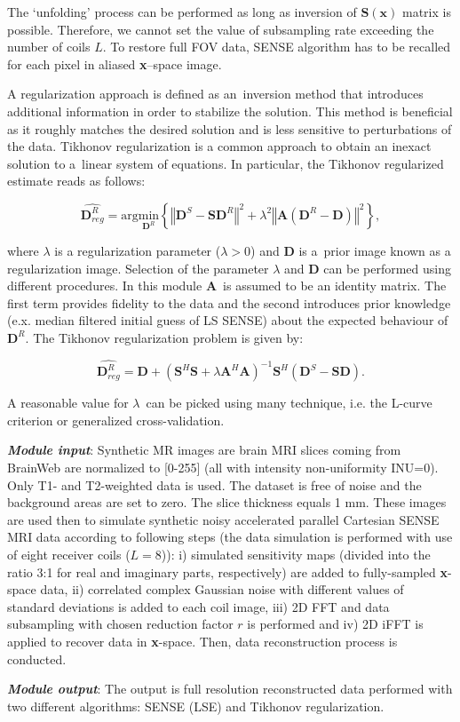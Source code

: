 The `unfolding' process can be performed as long as inversion of $\textbf{S}(\textbf{x})$
matrix is possible. Therefore, we cannot set the value of subsampling
rate exceeding the number of coils $L$. To restore full FOV data,
SENSE algorithm has to be recalled for each pixel in aliased \textbf{x}–space
image.

A regularization approach is defined as an~inversion method that
introduces additional information in order to stabilize the solution.
This method is beneficial as it roughly matches the desired solution
and is less sensitive to perturbations of the data. Tikhonov regularization
is a common approach to obtain an inexact solution to a~linear system
of equations. In particular, the Tikhonov regularized estimate reads
as follows:

\begin{equation}
\widehat{\textbf{D}_{reg}^{R}}=\text{arg}\underset{\textbf{D}^{R}}{\text{min}}\left\{ \left\Vert \textbf{D}^{S}-\textbf{S}\textbf{D}^{R}\right\Vert ^{2}+\lambda^{2}\left\Vert \textbf{A}(\textbf{D}^{R}-\textbf{D})\right\Vert ^{2}\right\} ,\label{Eq:wzor6}
\end{equation}

where $\lambda$ is a regularization parameter ($\lambda>0$) and
$\textbf{D}$ is a~prior image known as a regularization image. Selection
of the parameter $\lambda$ and $\textbf{D}$ can be performed using
different procedures. In this module $\textbf{A}$~is assumed to
be an identity matrix. The first term provides fidelity to the data
and the second introduces prior knowledge (e.x. median filtered initial
guess of LS SENSE) about the expected behaviour of $\textbf{D}^{R}$.
The Tikhonov regularization problem is given by:

\begin{equation}
\widehat{\textbf{D}_{reg}^{R}}=\textbf{D}+(\textbf{S}^{H}\textbf{S}+\lambda\textbf{A}^{H}\textbf{A})^{-1}\textbf{S}^{H}(\textbf{D}^{S}-\textbf{S}\textbf{D}).\label{Eq:wzor7}
\end{equation}

A reasonable value for $\lambda$~can be picked using many technique,
i.e. the L-curve criterion or generalized cross-validation.

\textbf{\emph{Module input}}: Synthetic MR images are brain MRI slices
coming from BrainWeb are normalized to {[}0-255{]} (all with intensity
non-uniformity INU=0). Only T1- and T2-weighted data is used. The
dataset is free of noise and the background areas are set to zero.
The slice thickness equals 1 mm. These images are used then to simulate
synthetic noisy accelerated parallel Cartesian SENSE MRI data according
to following steps (the data simulation is performed with use of eight
receiver coils ($L=8$)): i) simulated sensitivity maps (divided into
the ratio 3:1 for real and imaginary parts, respectively) are added
to fully-sampled \textbf{x}-space data, ii) correlated complex Gaussian
noise with different values of standard deviations is added to each
coil image, iii) 2D FFT and data subsampling with chosen reduction
factor $r$ is performed and iv) 2D iFFT is applied to recover data
in \textbf{x}-space. Then, data reconstruction process is conducted.

\textbf{\emph{Module output}}: The output is full resolution reconstructed
data performed with two different algorithms: SENSE (LSE) and Tikhonov
regularization. \\